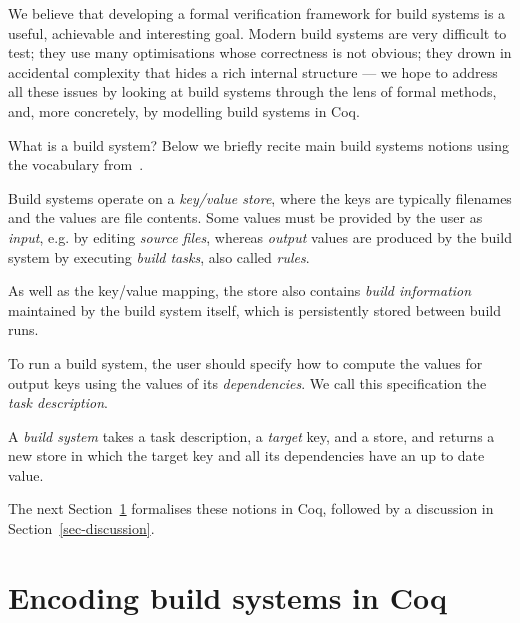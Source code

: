 \documentclass[sigplan,review]{acmart}\settopmatter{printfolios=true,printccs=false,printacmref=false}
\begin{document}
We believe that developing a formal verification framework for build systems
is a useful, achievable and interesting goal. Modern build systems are
very difficult to test; they use many optimisations whose correctness is not
obvious; they drown in accidental complexity that hides a rich internal
structure --- we hope to address all these issues by looking at build systems
through the lens of formal methods, and, more concretely, by modelling build
systems in Coq.

What is a build system? Below we briefly recite main build systems notions
using the vocabulary from~\cite{Mokhov2018icfp}.

Build systems operate on a \emph{key/value store}, where the keys are typically
filenames and the values are file contents. Some values must be provided by
the user as \emph{input}, e.g. by editing \emph{source files}, whereas
\emph{output} values are produced by the build system by executing \emph{build
tasks}, also called \emph{rules}.

As well as the key/value mapping, the store also contains \emph{build
information} maintained by the build system itself, which is persistently stored
between build runs.

To run a build system, the user should specify how to compute the values for
output keys using the values of its \emph{dependencies}. We call this
specification the \emph{task description}.

A \emph{build system} takes a task description, a \emph{target} key, and a
store, and returns a new store in which the target key and all its dependencies
have an up to date value.

The next Section~\ref{sec-abstractions} formalises these notions in Coq,
followed by a discussion in Section~\ref{sec-discussion}.

\vspace{-3mm}
\section{Encoding build systems in Coq}\label{sec-abstractions}
\vspace{-1mm}
\end{document}
